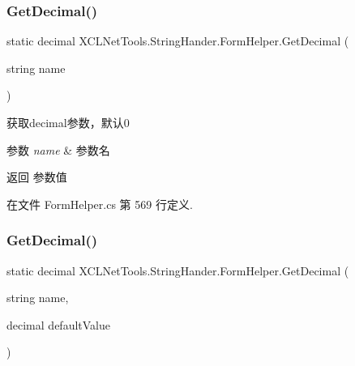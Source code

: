 \subsubsection{\texorpdfstring{Get\+Decimal()}{GetDecimal()}\hspace{0.1cm}{\footnotesize\ttfamily [1/2]}}
{\footnotesize\ttfamily static decimal X\+C\+L\+Net\+Tools.\+String\+Hander.\+Form\+Helper.\+Get\+Decimal (\begin{DoxyParamCaption}\item[{string}]{name }\end{DoxyParamCaption})\hspace{0.3cm}{\ttfamily [static]}}



获取decimal参数，默认0 


\begin{DoxyParams}{参数}
{\em name} & 参数名\\
\hline
\end{DoxyParams}
\begin{DoxyReturn}{返回}
参数值
\end{DoxyReturn}


在文件 Form\+Helper.\+cs 第 569 行定义.

\mbox{\label{class_x_c_l_net_tools_1_1_string_hander_1_1_form_helper_ab147eaeb86996c9c03099a5bd6d6ac6d}} 
\subsubsection{\texorpdfstring{Get\+Decimal()}{GetDecimal()}\hspace{0.1cm}{\footnotesize\ttfamily [2/2]}}
{\footnotesize\ttfamily static decimal X\+C\+L\+Net\+Tools.\+String\+Hander.\+Form\+Helper.\+Get\+Decimal (\begin{DoxyParamCaption}\item[{string}]{name,  }\item[{decimal}]{default\+Value }\end{DoxyParamCaption})\hspace{0.3cm}{\ttfamily [static]}}



